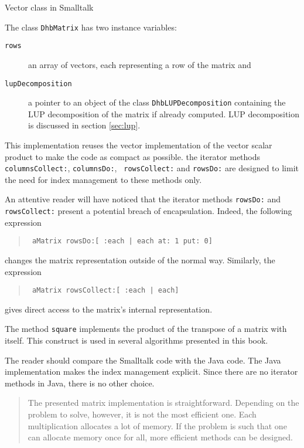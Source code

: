 \documentclass[twoside]{book}
\begin{document}
\begin{listing} Vector class in Smalltalk \label{ls:vector}

\end{listing}

\noindent The class {\tt DhbMatrix} has two instance variables:
\begin{description}
\item[\tt rows] an array of vectors, each representing a
row of the matrix and
\item[\tt lupDecomposition ] a pointer to an object of the class
{\tt DhbLUPDecomposition} containing the LUP decomposition of the
matrix if already computed. LUP decomposition is discussed in
section \ref{sec:lup}.
\end{description}
This implementation reuses the vector implementation of the vector
scalar product to make the code as compact as possible. the
iterator methods {\tt columnsCollect:}, {\tt columnsDo:}, {\tt
rowsCollect:} and {\tt rowsDo:} are designed to limit the need for
index management to these methods only.

An attentive reader will have noticed that the iterator methods
{\tt rowsDo:} and {\tt rowsCollect:} present a potential breach of
encapsulation. Indeed, the following expression
\begin{quote}
\begin{verbatim}
 aMatrix rowsDo:[ :each | each at: 1 put: 0]
\end{verbatim}
\end{quote}
changes the matrix representation outside of the normal way.
Similarly, the expression
\begin{quote}
\begin{verbatim}
 aMatrix rowsCollect:[ :each | each]
\end{verbatim}
\end{quote}
gives direct access to the matrix's internal representation.

The method {\tt square} implements the product of the transpose of
a matrix with itself. This construct is used in several algorithms
presented in this book.

The reader should compare the Smalltalk code with the Java code.
The Java implementation makes the index management explicit. Since
there are no iterator methods in Java, there is no other choice.

\begin{quotation}
 The presented matrix implementation is
straightforward. Depending on the problem to solve, however, it is
not the most efficient one. Each multiplication allocates a lot of
memory. If the problem is such that one can allocate memory once
for all, more efficient methods can be designed.
\end{quotation}
\end{document}
